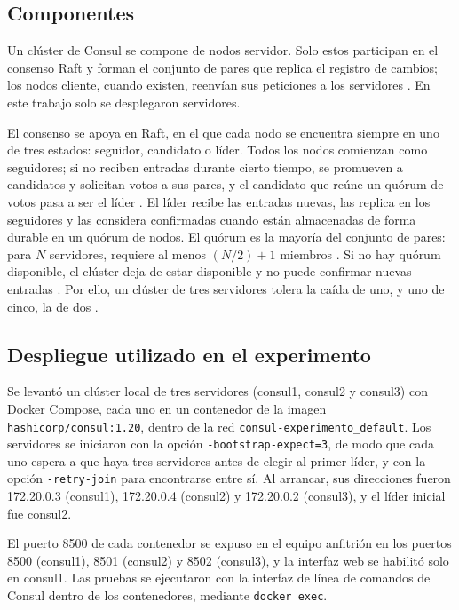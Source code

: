 \documentclass[12pt,a4paper]{article}
\begin{document}
\subsection{Componentes}

Un clúster de Consul se compone de nodos servidor. Solo estos participan en el consenso Raft
y forman el conjunto de pares que replica el registro de cambios; los nodos cliente, cuando
existen, reenvían sus peticiones a los servidores \cite{consul_consensus}. En este trabajo
solo se desplegaron servidores.

El consenso se apoya en Raft, en el que cada nodo se encuentra siempre en uno de tres
estados: seguidor, candidato o líder. Todos los nodos comienzan como seguidores; si no reciben
entradas durante cierto tiempo, se promueven a candidatos y solicitan votos a sus pares, y el
candidato que reúne un quórum de votos pasa a ser el líder \cite{consul_consensus}. El líder
recibe las entradas nuevas, las replica en los seguidores y las considera confirmadas cuando
están almacenadas de forma durable en un quórum de nodos. El quórum es la mayoría del
conjunto de pares: para $N$ servidores, requiere al menos $(N/2)+1$ miembros
\cite{consul_consensus}. Si no hay quórum disponible, el clúster deja de estar disponible y no
puede confirmar nuevas entradas \cite{consul_consensus}. Por ello, un clúster de tres
servidores tolera la caída de uno, y uno de cinco, la de dos \cite{consul_consensus}.

\subsection{Despliegue utilizado en el experimento}

Se levantó un clúster local de tres servidores (consul1, consul2 y consul3) con Docker
Compose, cada uno en un contenedor de la imagen \texttt{hashicorp/consul:1.20}, dentro de la
red \texttt{consul-experimento\_default}. Los servidores se iniciaron con la opción
\texttt{-bootstrap-expect=3}, de modo que cada uno espera a que haya tres servidores antes de
elegir al primer líder, y con la opción \texttt{-retry-join} para encontrarse entre sí. Al
arrancar, sus direcciones fueron 172.20.0.3 (consul1), 172.20.0.4 (consul2) y 172.20.0.2
(consul3), y el líder inicial fue consul2.

El puerto 8500 de cada contenedor se expuso en el equipo anfitrión en los puertos 8500
(consul1), 8501 (consul2) y 8502 (consul3), y la interfaz web se habilitó solo en consul1.
Las pruebas se ejecutaron con la interfaz de línea de comandos de Consul dentro de los
contenedores, mediante \texttt{docker exec}.
\end{document}

